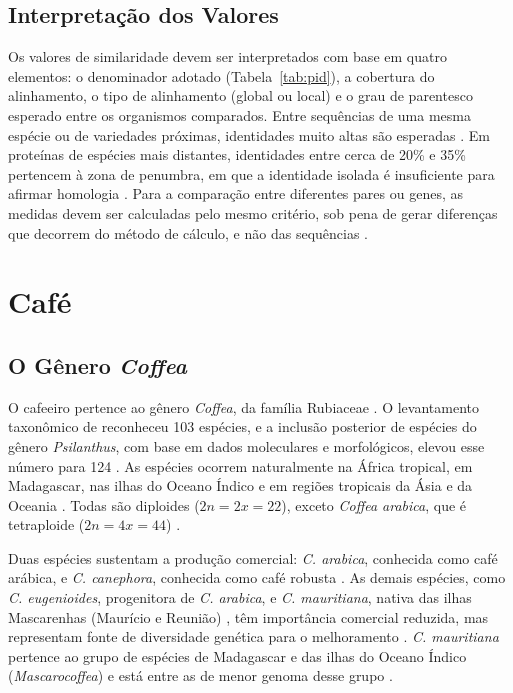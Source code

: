 \subsection{Interpretação dos Valores}

Os valores de similaridade devem ser interpretados com base em quatro elementos: o denominador adotado (Tabela~\ref{tab:pid}), a cobertura do alinhamento, o tipo de alinhamento (global ou local) e o grau de parentesco esperado entre os organismos comparados. Entre sequências de uma mesma espécie ou de variedades próximas, identidades muito altas são esperadas \cite{Medrano2025}. Em proteínas de espécies mais distantes, identidades entre cerca de 20\% e 35\% pertencem à zona de penumbra, em que a identidade isolada é insuficiente para afirmar homologia \cite{Rost1999}. Para a comparação entre diferentes pares ou genes, as medidas devem ser calculadas pelo mesmo critério, sob pena de gerar diferenças que decorrem do método de cálculo, e não das sequências \cite{Raghava2006}.

\section{Café}
\label{sec:cafe}

\subsection{O Gênero \textit{Coffea}}

O cafeeiro pertence ao gênero \textit{Coffea}, da família Rubiaceae \cite{Davis2006}. O levantamento taxonômico de  reconheceu 103 espécies, e a inclusão posterior de espécies do gênero \textit{Psilanthus}, com base em dados moleculares e morfológicos, elevou esse número para 124 \cite{Davis2011}. As espécies ocorrem naturalmente na África tropical, em Madagascar, nas ilhas do Oceano Índico e em regiões tropicais da Ásia e da Oceania \cite{Davis2006, Davis2011}. Todas são diploides ($2n = 2x = 22$), exceto \textit{Coffea arabica}, que é tetraploide ($2n = 4x = 44$) \cite{Davis2011}.

Duas espécies sustentam a produção comercial: \textit{C. arabica}, conhecida como café arábica, e \textit{C. canephora}, conhecida como café robusta \cite{Privat2008}. As demais espécies, como \textit{C. eugenioides}, progenitora de \textit{C. arabica}, e \textit{C. mauritiana}, nativa das ilhas Mascarenhas (Maurício e Reunião) \cite{Davis2006, Dulloo1999}, têm importância comercial reduzida, mas representam fonte de diversidade genética para o melhoramento \cite{Scalabrin2020}. \textit{C. mauritiana} pertence ao grupo de espécies de Madagascar e das ilhas do Oceano Índico (\textit{Mascarocoffea}) e está entre as de menor genoma desse grupo \cite{Razafinarivo2012}.

